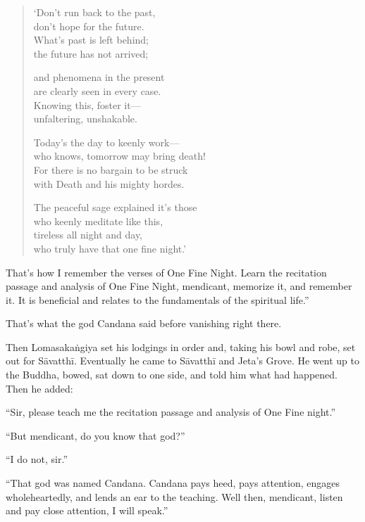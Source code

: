 \documentclass[12pt,openany]{book}%
\begin{document}
\begin{verse}%
‘Don’t run back to the past, \\
don’t hope for the future. \\
What’s past is left behind; \\
the future has not arrived; 

and phenomena in the present \\
are clearly seen in every case. \\
Knowing this, foster it—\\
unfaltering, unshakable. 

Today’s the day to keenly work—\\
who knows, tomorrow may bring death! \\
For there is no bargain to be struck \\
with Death and his mighty hordes. 

The peaceful sage explained it’s those \\
who keenly meditate like this, \\
tireless all night and day, \\
who truly have that one fine night.’ 

%
\end{verse}

That’s how I remember the verses of One Fine Night. Learn the recitation passage and analysis of One Fine Night, mendicant, memorize it, and remember it. It is beneficial and relates to the fundamentals of the spiritual life.” 

That’s what the god Candana said before vanishing right there. 

Then \textsanskrit{Lomasakaṅgiya} set his lodgings in order and, taking his bowl and robe, set out for \textsanskrit{Sāvatthī}. Eventually he came to \textsanskrit{Sāvatthī} and Jeta’s Grove. He went up to the Buddha, bowed, sat down to one side, and told him what had happened. Then he added: 

“Sir, please teach me the recitation passage and analysis of One Fine night.” 

“But mendicant, do you know that god?” 

“I do not, sir.” 

“That god was named Candana. Candana pays heed, pays attention, engages wholeheartedly, and lends an ear to the teaching. Well then, mendicant, listen and pay close attention, I will speak.” 
\end{document}
